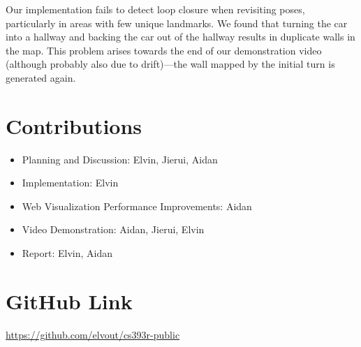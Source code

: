 \documentclass[11pt]{article}
\begin{document}
\bigskip
\noindent
Our implementation fails to detect loop closure when revisiting poses,
particularly in areas with few unique landmarks. We found that turning the car
into a hallway and backing the car out of the hallway results in duplicate walls
in the map. This problem arises towards the end of our demonstration video
(although probably also due to drift)---the wall mapped by the initial turn is
generated again.

\section{Contributions}

\begin{itemize}
    \setlength\itemsep{0pt}
    \item Planning and Discussion: Elvin, Jierui, Aidan
    \item Implementation: Elvin
    \item Web Visualization Performance Improvements: Aidan
    \item Video Demonstration: Aidan, Jierui, Elvin
    \item Report: Elvin, Aidan
\end{itemize}

\section{GitHub Link}

\href{https://github.com/elvout/cs393r-public}{https://github.com/elvout/cs393r-public}
\end{document}
